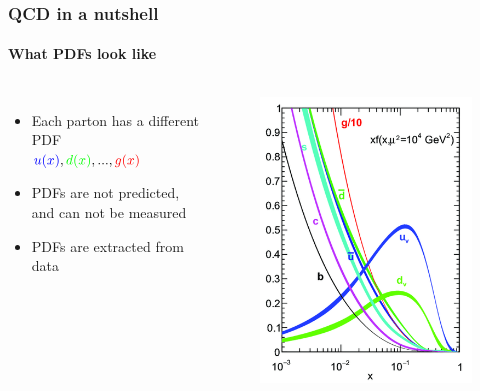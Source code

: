 \documentclass[aspectratio=43]{beamer}
\begin{document}
\begin{frame}

	\frametitle{QCD in a nutshell}
	\framesubtitle{What PDFs look like}
	
	\begin{columns}
	
		\begin{itemize}
			\item Each parton has a different PDF \\ ${\color{blue}u(x)}, {\color{green}d(x)}, ..., {\color{red}g(x)}$
			\item PDFs are not predicted, and can not be measured
			\item PDFs are {\color{blue}extracted} from data
		\end{itemize}

		\begin{figure}
			\includegraphics[width = 3.8 cm]{plots/PDF.png}
		\end{figure}

	\end{columns}

\end{frame}

\begin{frame}
	

\end{frame}
\end{document}
